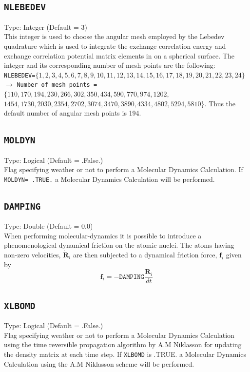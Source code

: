 \documentclass[a4paper,twoside,openany]{book}
\begin{document}
 \subsection{\texttt{NLEBEDEV}}
 Type: Integer (Default = 3)\\
 This integer is used to choose the angular mesh employed by the Lebedev quadrature which is used to  integrate  the exchange correlation energy and exchange correlation potential matrix elements in 
 on a spherical surface. The integer and its corresponding number of mesh points are the following: \\
  \texttt{NLEBEDEV=}$\{1,2,3,4,5,6,7,8,9,10,11,12,13,14,15,16,17,18,19,20,21,22,23,24\}$ \\
 $\rightarrow$ \texttt{Number of mesh points = }$\{110,170,194,230,266,302,350,434,590,770,974,1202,$\\
 $ 1454, 1730, 2030, 2354, 2702, 3074, 3470, 3890, 4334, 4802, 5294, 5810\}$. Thus the default number of angular mesh points is 194. \\ 
  
 \subsection{\texttt{MOLDYN}}
Type: Logical (Default = .False.)\\
Flag specifying weather or not to perform a Molecular Dynamics Calculation. If \texttt{MOLDYN= .TRUE.} a Molecular Dynamics Calculation will be performed.

 \subsection{\texttt{DAMPING}}
Type: Double (Default = 0.0)\\
When performing molecular-dynamics it is possible to introduce a phenomenological dynamical friction on the atomic nuclei. The atoms having non-zero
velocities, $\dot{\mathbf{R}}_{i}$ are then subjected to a dynamical friction force, $\mathbf{f}_{i}$ given by
\begin{equation}
\mathbf{f}_{i} = -\texttt{DAMPING}\frac{\mathbf{R}_{i}}{dt}
\end{equation}

 \subsection{\texttt{XLBOMD}}
Type: Logical (Default = .False.)\\
Flag specifying weather or not to perform a Molecular Dynamics Calculation using the time reversible  propagation algorithm by A.M Niklasson
 \cite{AMN1} for updating the density matrix at each time step. If  \texttt{XLBOMD}  is .TRUE. a Molecular Dynamics Calculation using the  A.M Niklasson 
scheme will be performed.
\end{document}
